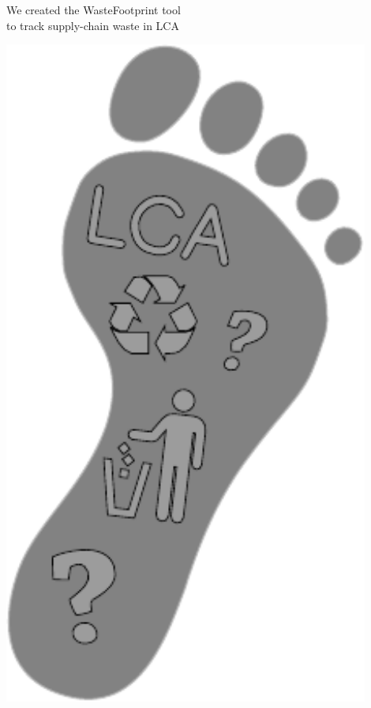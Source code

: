 \documentclass[a0paper,fleqn]{betterposter}
\begin{document}
{{\begin{minipage}{0.50\textwidth}
            \vspace{200pt}
            \begin{center}
            \begin{spacing}{3}
            {\fontsize{46}{20}\selectfont We created the WasteFootprint tool\\to track supply-chain waste in LCA\\}
            \vspace{10pt}
            \end{spacing}
            \vspace{30pt}
            \end{center}
            \end{minipage}
        \begin{minipage}{0.5\textwidth}
        \begin{flushleft}
            \vspace{220pt}
            \includegraphics[width=0.9\textwidth]{img/foot.pdf}

\end{flushleft}
\end{minipage}}}
\end{document}
